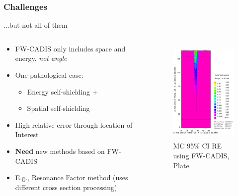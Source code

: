 \documentclass[xcolor=x11names,compress]{beamer}
\renewcommand{\(}{\begin{columns}}
\renewcommand{\)}{\end{columns}}
\newcommand{\<}[1]{\begin{column}{#1}}
\renewcommand{\>}{\end{column}}
\begin{document}
\begin{frame}[fragile]
  \frametitle{Challenges}

	...but not all of them
	\begin{columns}
  	\begin{column}{0.5\textwidth}
  	\begin{center}
		\begin{itemize}
		\item FW-CADIS only includes space and energy, 
			\textit{not angle}
		\item One pathological case:
		\begin{itemize}
		\item Energy self-shielding +
		\item Spatial self-shielding
		\end{itemize}
		\item High relative error through location of Interest
		\item \textbf{Need} new methods based on FW-CADIS
		\item E.g., Resonance Factor method (uses different cross section processing)
		\end{itemize}
	\end{center}
  	\end{column}
 	\begin{column}{0.5\textwidth}
  	\begin{center}
  	\begin{figure}
  		\includegraphics[height=2in,clip]{plate-badVR}
  		\caption{MC 95\% CI RE using FW-CADIS, Plate}
  	\end{figure}
  	\end{center}
  	\end{column}
	\end{columns}
  
\end{frame}


\end{document}
